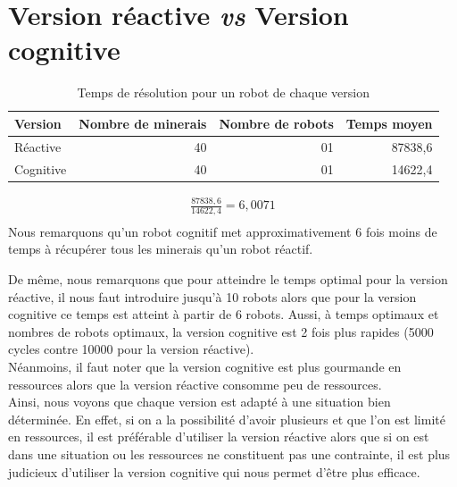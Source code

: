 \section{Version réactive \textit{vs} Version cognitive}

\begin{table}[!h]
	\begin{center}
		\begin{tabular}{|l|r|r|r|}
			\hline
			Version & Nombre de minerais & Nombre de robots & Temps moyen \\
			\hline
			Réactive   & 40 & 01 & 87838,6\\
			Cognitive  & 40 & 01 & 14622,4\\
			\hline
		\end{tabular}
	\end{center}
	\caption{Temps de résolution pour un robot de chaque version}
\end{table}

\begin{align*}
\frac{87838,6}{14622,4} = 6, 0071\\
\end{align*}
Nous remarquons qu'un robot cognitif met approximativement 6 fois moins de temps à récupérer tous les minerais qu'un robot réactif.

\begin{center}
\end{center}
De même, nous remarquons que pour atteindre le temps optimal pour la version réactive, il nous faut introduire jusqu'à 10 robots alors que pour la version cognitive ce temps est atteint à partir de 6 robots. Aussi, à temps optimaux et nombres de robots optimaux, la version cognitive est 2 fois plus rapides (5000 cycles contre 10000 pour la version réactive).\\
Néanmoins, il faut noter que la version cognitive est plus gourmande en ressources alors que la version réactive consomme peu de ressources.\\
Ainsi, nous voyons que chaque version est adapté à une situation bien déterminée. En effet, si on a la possibilité d'avoir plusieurs et que l'on est limité en ressources, il est préférable d'utiliser la version réactive alors que si on est dans une situation ou les ressources ne constituent pas une contrainte, il est plus judicieux d'utiliser la version cognitive qui nous permet d'être plus efficace.